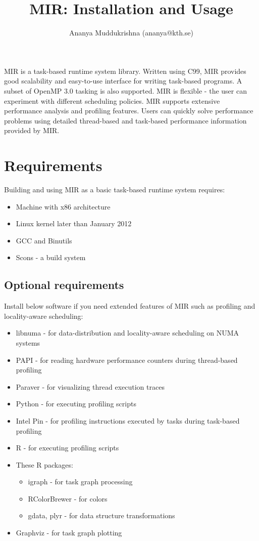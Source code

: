 \documentclass[11pt,a4paper,notitlepage]{report}
\author{Ananya Muddukrishna (ananya@kth.se)}
\title{MIR: Installation and Usage}
\begin{document}
\maketitle

MIR is a task-based runtime system library.
Written using C99, MIR provides good scalability and easy-to-use interface for writing task-based programs.
A subset of OpenMP 3.0 tasking is also supported.
MIR is flexible - the user can experiment with different scheduling policies.
MIR supports extensive performance analysis and profiling features.
Users can quickly solve performance problems using detailed thread-based and task-based performance information provided by MIR.

\section{Requirements}
Building and using MIR as a basic task-based runtime system requires:
\begin{itemize}
\item Machine with x86 architecture
\item Linux kernel later than January 2012
\item GCC and Binutils
\item Scons - a build system
\end{itemize}

\subsection{Optional requirements}
Install below software if you need extended features of MIR such as profiling and locality-aware scheduling:
\begin{itemize}
\item libnuma - for data-distribution and locality-aware scheduling on NUMA systems
\item PAPI - for reading hardware performance counters during thread-based profiling
\item Paraver - for visualizing thread execution traces
\item Python - for executing profiling scripts
\item Intel Pin  - for profiling instructions executed by tasks during task-based profiling
\item R - for executing profiling scripts
\item These R packages: 
\begin{itemize}
\item igraph - for task graph processing
\item RColorBrewer - for colors
\item gdata, plyr - for data structure transformations
\end{itemize}
\item Graphviz - for task graph plotting
\end{itemize}
\end{document}
